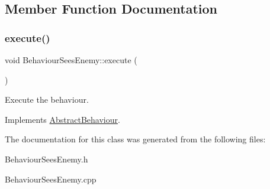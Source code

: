 \subsection{Member Function Documentation}
\mbox{\label{class_behaviour_sees_enemy_afddbf2ca7396c9fd7b24f4be60edb84c}} 
\subsubsection{\texorpdfstring{execute()}{execute()}}
{\footnotesize\ttfamily void Behaviour\+Sees\+Enemy\+::execute (\begin{DoxyParamCaption}{ }\end{DoxyParamCaption})\hspace{0.3cm}{\ttfamily [virtual]}}



Execute the behaviour. 



Implements \mbox{\hyperlink{class_abstract_behaviour_ab99fb55a3b001e759e24d5b9721a742f}{Abstract\+Behaviour}}.



The documentation for this class was generated from the following files\+:\begin{DoxyCompactItemize}
\item 
Behaviour\+Sees\+Enemy.\+h\item 
Behaviour\+Sees\+Enemy.\+cpp\end{DoxyCompactItemize}
